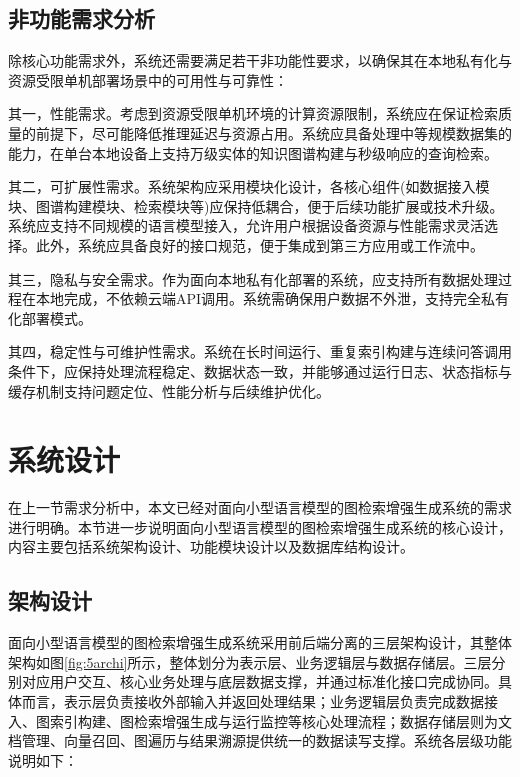 \documentclass[promaster, vlined]{DissertUESTC}
\begin{document}
\subsection{非功能需求分析}

除核心功能需求外，系统还需要满足若干非功能性要求，以确保其在本地私有化与资源受限单机部署场景中的可用性与可靠性：

其一，性能需求。考虑到资源受限单机环境的计算资源限制，系统应在保证检索质量的前提下，尽可能降低推理延迟与资源占用。系统应具备处理中等规模数据集的能力，在单台本地设备上支持万级实体的知识图谱构建与秒级响应的查询检索。

其二，可扩展性需求。系统架构应采用模块化设计，各核心组件(如数据接入模块、图谱构建模块、检索模块等)应保持低耦合，便于后续功能扩展或技术升级。系统应支持不同规模的语言模型接入，允许用户根据设备资源与性能需求灵活选择。此外，系统应具备良好的接口规范，便于集成到第三方应用或工作流中。

其三，隐私与安全需求。作为面向本地私有化部署的系统，应支持所有数据处理过程在本地完成，不依赖云端API调用。系统需确保用户数据不外泄，支持完全私有化部署模式。

其四，稳定性与可维护性需求。系统在长时间运行、重复索引构建与连续问答调用条件下，应保持处理流程稳定、数据状态一致，并能够通过运行日志、状态指标与缓存机制支持问题定位、性能分析与后续维护优化。

\section{系统设计}
在上一节需求分析中，本文已经对面向小型语言模型的图检索增强生成系统的需求进行明确。本节进一步说明面向小型语言模型的图检索增强生成系统的核心设计，内容主要包括系统架构设计、功能模块设计以及数据库结构设计。
\subsection{架构设计}

面向小型语言模型的图检索增强生成系统采用前后端分离的三层架构设计，其整体架构如图\ref{fig:5archi}所示，整体划分为表示层、业务逻辑层与数据存储层。三层分别对应用户交互、核心业务处理与底层数据支撑，并通过标准化接口完成协同。具体而言，表示层负责接收外部输入并返回处理结果；业务逻辑层负责完成数据接入、图索引构建、图检索增强生成与运行监控等核心处理流程；数据存储层则为文档管理、向量召回、图遍历与结果溯源提供统一的数据读写支撑。系统各层级功能说明如下：
\end{document}
